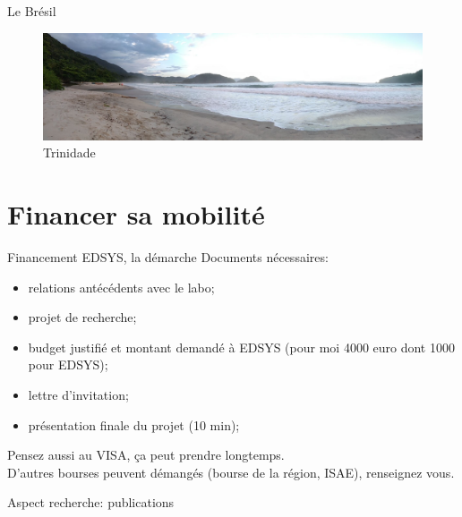 \documentclass{beamer}
\begin{document}
\begin{frame}{Le Brésil}
{\begin{figure}
\end{figure}
\begin{figure}
	\centering
	\includegraphics[width=.9\linewidth]{trinidade_plage.jpg}\caption{Trinidade}
\end{figure}
}

\end{frame}

\section{Financer sa mobilité}
\begin{frame}{Financement EDSYS, la démarche}
Documents nécessaires:
\begin{itemize}
	\item relations antécédents avec le labo;
	\item projet de recherche;
	\item budget justifié et montant demandé à EDSYS (pour moi 4000 euro dont 1000 pour EDSYS);
	\item lettre d'invitation;
	\item présentation finale du projet (10 min);
\end{itemize}
Pensez aussi au VISA, ça peut prendre longtemps. \\
D'autres bourses peuvent démangés (bourse de la région, ISAE), renseignez vous.
\end{frame}

\begin{frame}[allowframebreaks]{Aspect recherche: publications}

\nocite{*}

\end{frame}
\end{document}
